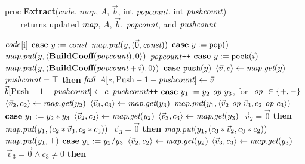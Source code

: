 \begin{algorithm}
proc {\bf Extract}($code$, $map$, $A$, $\vec b$, int $\mbox{\it popcount}$, int $\mbox{\it pushcount}$) \\
\verb+   + returns updated $\mbox{\it map}$, $A$, ${\vec b}$, $\mbox{\it popcount}$, and $\mbox{\it pushcount}$ \\ \vspace{-12pt}
\begin{algorithmic}
 $\mbox{\it code}$[i]
\IND
\STATE $\mbox{\bf case}~y := \mbox{\it const}$
\IND
\STATE $\mbox{\it map}.\mbox{\it put}(y, (\vec 0, \mbox{\it const}))$
\UND
\STATE \vspace{-6pt}
\STATE $\mbox{\bf case}~y := \mbox{\tt pop}()$
\IND
\STATE $\mbox{\it map}.\mbox{\it put}(y, \langle{\mbox{\bf BuildCoeff}(\mbox{\it popcount})}, {0}\rangle)$
\STATE $\mbox{\it popcount}$\verb|++|
\UND
\STATE \vspace{-6pt}
\STATE $\mbox{\bf case}~y := \mbox{\tt peek}(i)$
\IND
\STATE $\mbox{\it map}.\mbox{\it put}(y, \langle{\mbox{\bf BuildCoeff}(\mbox{\it popcount}+i)}, {0}\rangle)$
\UND
\STATE \vspace{-6pt}
\STATE $\mbox{\bf case}~\mbox{\tt push}(y)$
\IND
\STATE $\langle{\vec v}, {c}\rangle \leftarrow \mbox{\it map}.\mbox{\it get}(y)$
 $\mbox{\it pushcount} = \top$ {\bf then} $\mbox{\it fail}$
\STATE $A[*, \mbox{Push} - 1 - \mbox{\it pushcount}] \leftarrow \vec v$
\STATE $\vec{b}[\mbox{Push} - 1 - \mbox{\it pushcount}] \leftarrow c$
\STATE $\mbox{\it pushcount}$\verb|++|
\UND
\STATE \vspace{-6pt}
\STATE $\mbox{\bf case}~ y_1 := y_2 \mbox{\it ~op~} y_3$, for $\mbox{\it ~op~} \in \{+, -\}$
\IND
\STATE $\langle{\vec v_2}, {c_2}\rangle \leftarrow \mbox{\it map}.\mbox{\it get}(y_2)$
\STATE $\langle{\vec v_3}, {c_3}\rangle \leftarrow \mbox{\it map}.\mbox{\it get}(y_3)$
\STATE $\mbox{\it map}.\mbox{\it put}(y_1, \langle{\vec v_2 \mbox{\it ~op~} \vec v_3}, {c_2 \mbox{\it ~op~} c_3}\rangle)$
\UND
\STATE \vspace{-6pt}
\STATE $\mbox{\bf case}~y_1 := y_2 * y_3$
\IND
\STATE $\langle{\vec v_2}, {c_2}\rangle \leftarrow \mbox{\it map}.\mbox{\it get}(y_2)$
\STATE $\langle{\vec v_3}, {c_3}\rangle \leftarrow \mbox{\it map}.\mbox{\it get}(y_3)$
 $~\vec v_2 = \vec 0$ {\bf then}
\IND
\STATE $\mbox{\it map}.\mbox{\it put}(y_1, (c_2*\vec v_3, c_2*c_3))$
\UND
{} $~\vec v_3=\vec 0$ {\bf then}
\IND
\STATE $\mbox{\it map}.\mbox{\it put}(y_1, (c_3*\vec v_2, c_3*c_2))$
\UND
{}
\IND
\STATE $\mbox{\it map}.\mbox{\it put}(y_1, \top)$
\UND
\UND
\STATE \vspace{-6pt}
\STATE $\mbox{\bf case}~y_1 := y_2 / y_3$
\IND
\STATE $\langle{\vec v_2}, {c_2}\rangle \leftarrow \mbox{\it map}.\mbox{\it get}(y_2)$
\STATE $\langle{\vec v_3}, {c_3}\rangle \leftarrow \mbox{\it map}.\mbox{\it get}(y_3)$
 $~\vec v_3 = \vec 0 \wedge c_3 \ne 0$ {\bf then}

\end{algorithmic}
\end{algorithm}
